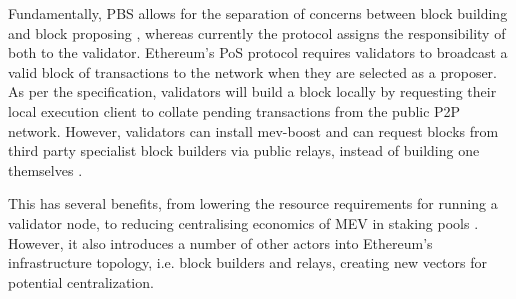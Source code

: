 \documentclass[conference]{IEEEtran}
\begin{document}
Fundamentally, PBS allows for the separation of concerns between block building and block proposing \cite{ethereum2023}, whereas currently the protocol assigns the responsibility of both to the validator.  Ethereum's PoS protocol requires validators to broadcast a valid block of transactions to the network when they are selected as a proposer.  As per the specification, validators will build a block locally by requesting their local execution client to collate pending transactions from the public P2P network. However, validators can install mev-boost and can request blocks from third party specialist block builders via public relays, instead of building one themselves \cite{ethereum2022}.

This has several benefits, from lowering the resource requirements for running a validator node, to reducing centralising economics of MEV in staking pools \cite{buterin2021}.  However, it also introduces a number of other actors into Ethereum's infrastructure topology, i.e. block builders and relays, creating new vectors for potential centralization.
\end{document}
